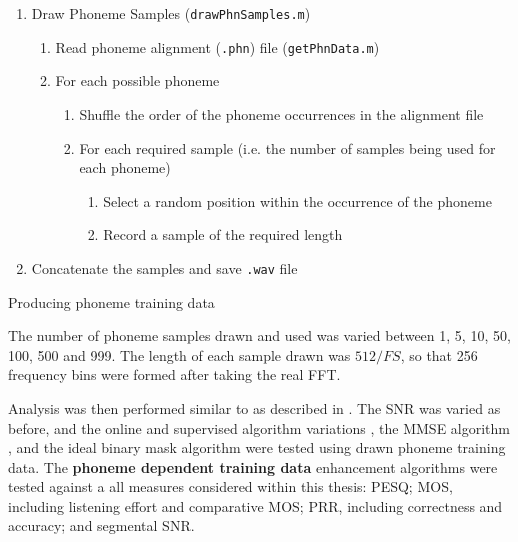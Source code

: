\begin{algorithm}
\begin{enumerate}
\item Draw Phoneme Samples (\lstinline!drawPhnSamples.m!)

\begin{enumerate}
\item Read phoneme alignment (\lstinline!.phn!) file (\lstinline!getPhnData.m!)
\item For each possible phoneme

\begin{enumerate}
\item Shuffle the order of the phoneme occurrences in the alignment file
\item For each required sample (i.e. the number of samples being used for
each phoneme)

\begin{enumerate}
\item Select a random position within the occurrence of the phoneme
\item Record a sample of the required length
\end{enumerate}
\end{enumerate}
\end{enumerate}
\item Concatenate the samples and save \lstinline!.wav! file
\end{enumerate}
\protect\caption{\label{alg:Producing-phoneme-training}Producing phoneme training
data}


\end{algorithm}


The number of phoneme samples drawn and used was varied between 1,
5, 10, 50, 100, 500 and 999. The length of each sample drawn was $512/FS$,
so that 256 frequency bins were formed after taking the real \ac{FFT}.

Analysis was then performed similar to as described in .
The \ac{SNR} was varied as before, and the online and supervised
algorithm variations \citep{mohammadiha2013supervised}, the \ac{MMSE}
algorithm \citep{Brookes1997}, and the ideal binary mask algorithm
\citep{Wojcicki2011} were tested using drawn phoneme training data.
The \textbf{phoneme dependent training data} enhancement algorithms
were tested against a all measures considered within this thesis:
\ac{PESQ}; \ac{MOS}, including listening effort and comparative
\ac{MOS}; \ac{PRR}, including correctness and accuracy; and segmental
\ac{SNR}.


